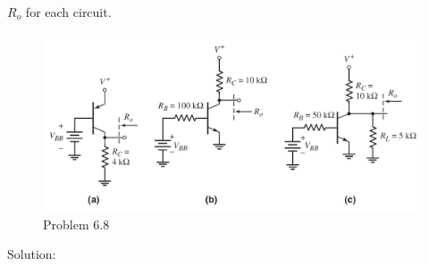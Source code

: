 \documentclass[a4paper,11pt,UTF8]{article}
\begin{document}
$R_o$ for each circuit.
\begin{figure}[H] 
	\centering 
	\includegraphics[scale=0.20]{MD6.8.png}
	\caption{Problem 6.8}
\end{figure}
\noindent Solution:\\
\end{document}
